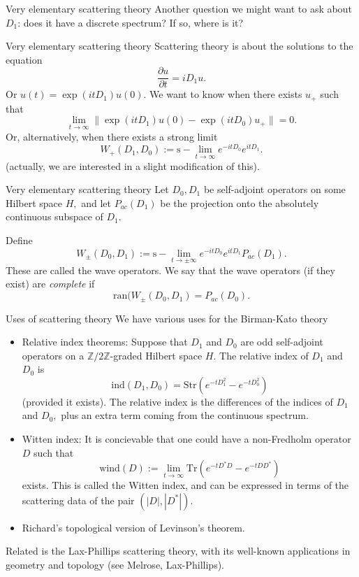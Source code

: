 \documentclass{beamer}
\numberwithin{equation}{section}
\theoremstyle{plain}
\theoremstyle{plain}
\theoremstyle{definition}
\theoremstyle{plain}
\theoremstyle{plain}
\theoremstyle{definition}
\newcommand{\Itgr}{\mathbb{Z}}
\newcommand{\Tr}{\mathrm{Tr}}
\begin{document}
\begin{frame}{Very elementary scattering theory}
  Another question we might want to ask about $D_1$: does it have a discrete spectrum? If so, where is it?
\end{frame}

\begin{frame}{Very elementary scattering theory}
  Scattering theory is about the solutions to the equation
  \[
    \frac{\partial u}{\partial t} = iD_1u.
  \]
  Or $u(t) = \exp(itD_1)u(0).$ We want to know when
  there exists $u_+$ such that
  \[
      \lim_{t\to\infty} \|\exp(itD_1)u(0)-\exp(itD_0)u_+\| = 0.
  \]
  Or, alternatively, when there exists a strong limit
  \[
    W_+(D_1,D_0) := {\mathrm{s}-}\lim_{t\to\infty} e^{-itD_0}e^{itD_1}.
  \]
  (actually, we are interested in a slight modification of this).
\end{frame}


\begin{frame}{Very elementary scattering theory}
  Let $D_0,D_1$ be self-adjoint operators on some Hilbert space $H,$ and let $P_{ac}(D_1)$ be the projection onto the absolutely continuous subspace of $D_1.$

  Define
  \[
    W_{\pm}(D_0,D_1) := {\mathrm{s}-}\lim_{t\to\pm \infty} e^{-itD_0}e^{itD_1}P_{ac}(D_1).
  \]
  These are called the wave operators. We say that the wave operators (if they exist) are \emph{complete}
  if
  \[
      \mathrm{ran}(W_{\pm}(D_0,D_1) = P_{ac}(D_0).
  \]
\end{frame}

\begin{frame}{Uses of scattering theory}
We have various uses for the Birman-Kato theory
\begin{itemize}
\item{} Relative index theorems: Suppose that $D_1$ and $D_0$ are odd self-adjoint operators on a $\Itgr/2\Itgr$-graded Hilbert space $H.$ The relative index of $D_1$ and $D_0$ is
\[
\mathrm{ind}(D_1,D_0) = \mathrm{Str}(e^{-tD_1^2}-e^{-tD_0^2})
\]
(provided it exists). The relative index is the differences of the indices of $D_1$ and $D_0,$ plus an extra term coming from the continuous spectrum.
\item{} Witten index: It is concievable that one could have a non-Fredholm operator $D$ such that
\[
\mathrm{wind}(D) := \lim_{t\to\infty}\Tr(e^{-tD^*D}-e^{-tDD^*})
\]
exists. This is called the Witten index, and can be expressed in terms of the scattering data of the pair $(|D|,|D^*|).$
\item{}Richard's topological version of Levinson's theorem.
\end{itemize}
Related is the Lax-Phillips scattering theory, with its well-known applications in geometry and topology (see Melrose, Lax-Phillips).
\end{frame}
\end{document}
